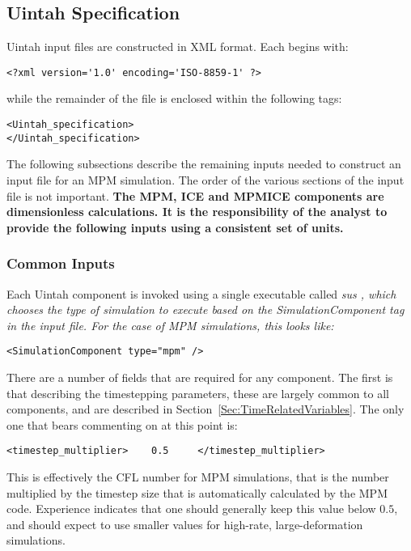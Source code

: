 \subsection{Uintah Specification} \label{Sec:UintahSpecMPM}

Uintah input files are constructed in XML format.  Each begins with:

\begin{Verbatim}[fontsize=\footnotesize]
<?xml version='1.0' encoding='ISO-8859-1' ?>
\end{Verbatim}
while the remainder of the file is enclosed within the following tags:
\begin{Verbatim}[fontsize=\footnotesize]
<Uintah_specification>
</Uintah_specification>
\end{Verbatim}

The following subsections describe the remaining inputs needed to construct
an input file for an MPM simulation.  The order of the various sections 
of the input file is not important.  {\bf The MPM, ICE and MPMICE components
are dimensionless calculations.  It is the responsibility of the analyst
to provide the following inputs using a consistent set of units.}

\subsubsection{Common Inputs}

Each Uintah component is invoked using a single executable called
\it sus \normalfont, which chooses the type of simulation
to execute based on the \it SimulationComponent \normalfont tag in the
input file.  For the case of MPM simulations, this looks like:

\begin{Verbatim}[fontsize=\footnotesize]
 <SimulationComponent type="mpm" />
\end{Verbatim}

There are a number of fields that are required for any component.  The first
is that describing the timestepping parameters, these are largely common to
all components, and are described in Section~\ref{Sec:TimeRelatedVariables}.
The only one that bears commenting on at this point is:

\begin{Verbatim}[fontsize=\footnotesize]
  <timestep_multiplier>    0.5     </timestep_multiplier>
\end{Verbatim}
This is effectively the CFL number for MPM simulations, that is the number
multiplied by the timestep size that is automatically calculated by the MPM
code.  Experience indicates that one should generally keep this value below
$0.5$, and should expect to use smaller values for high-rate, large-deformation
simulations.


